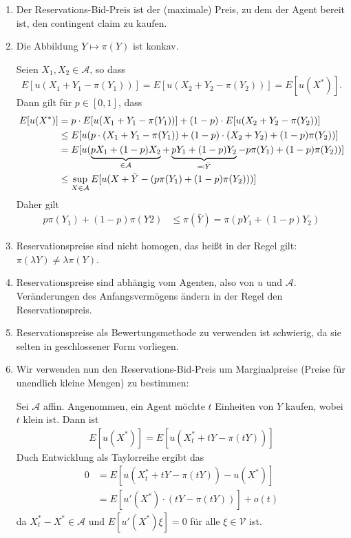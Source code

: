 \documentclass[a4paper,twoside,DIV15,BCOR12mm]{scrbook}
\newcommand{\cA}{\mathcal A}
\newcommand{\cV}{\mathcal V}
\begin{document}
\begin{bemerkung}
\begin{enumerate}
\item Der Reservations-Bid-Preis ist der (maximale) Preis, zu dem der Agent bereit ist, den contingent claim zu kaufen.
\item Die Abbildung $Y\mapsto\pi(Y)$ ist konkav.
\begin{beweis}
Seien $X_1,X_2\in\cA$, so dass
\[E[u(X_1 + Y_1 - \pi(Y_1))] = E[u(X_2+Y_2-\pi(Y_2))] = E[u(X^*)].\]
Dann gilt für $p\in[0, 1]$, dass
\begin{align*}
E[u(X^*)] &= p\cdot E[u(X_1+Y_1-\pi(Y_1))] + (1-p)\cdot E[u(X_2+Y_2-\pi(Y_2))]\\
&\le E[u(p\cdot(X_1+Y_1-\pi(Y_1)) + (1-p)\cdot(X_2+Y_2) + (1-p)\pi(Y_2))] \\
&= E[u(\underbrace{p X_1 + (1-p) X_2}_{\in\cA} + \underbrace{p Y_1 + (1-p)Y_2}_{\ad \bar Y} - p \pi(Y_1) + (1-p) \pi(Y_2))] \\
&\le \sup_{X\in\cA} E[u(X + \bar Y - (p\pi(Y_1) + (1-p) \pi(Y_2)))]
\end{align*}
Daher gilt
\begin{align*}
p\pi(Y_1)+ (1-p)\pi(Y2) &\le \pi(\bar Y) =\pi (p Y_1 + (1-p)Y_2)
\end{align*}
\end{beweis}

\item Reservationspreise sind nicht homogen, das heißt in der Regel gilt: $\pi(\lambda Y) \ne \lambda \pi(Y)$.
\item Reservationspreise sind abhängig vom Agenten, also von $u$ und $\cA$. Veränderungen des Anfangsvermögens ändern in der Regel den Reservationspreis.
\item Reservationspreise als Bewertungsmethode zu verwenden ist schwierig, da sie selten in geschlossener Form vorliegen.
\item Wir verwenden nun den Reservations-Bid-Preis um Marginalpreise (Preise für unendlich kleine Mengen) zu bestimmen:

Sei $\cA$ affin. Angenommen, ein Agent möchte $t$ Einheiten von $Y$ kaufen, wobei $t$ klein ist. Dann ist 
\begin{align*}
E[u(X^*)]=E[u(X_t^* + tY - \pi(tY))]
\end{align*}
Duch Entwicklung als Taylorreihe ergibt das
\begin{align*}
0
&= E[u(X_t^* + tY -\pi(tY)) - u(X^*)] \\
&= E[u'(X^*) \cdot (tY - \pi(tY))] + o(t)
\end{align*}
da $X_t^* - X^*\in\cA$ und $E[u'(X^*)\xi]=0$ für alle $\xi\in\cV$ ist.


\end{enumerate}
\end{bemerkung}
\end{document}
